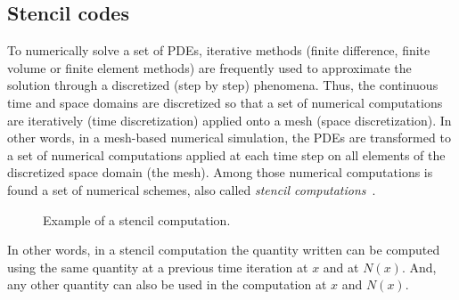 \subsection{Stencil codes}
\label{sect:stencil}
To numerically solve a set of PDEs, iterative methods (finite difference, finite volume or finite element methods) are frequently used to approximate the solution through a discretized (step by step) phenomena. Thus, the continuous time and space domains are discretized so that a set of numerical computations are iteratively (time discretization) applied onto a mesh (space discretization). In other words, in a mesh-based numerical simulation, the PDEs are transformed to a set of numerical computations applied at each time step on all elements of the discretized space domain (the mesh). Among those numerical computations is found a set of numerical schemes, also called \textit{stencil computations}~\cite{spaaTangCKLL11}. 

\begin{figure}[!h]\begin{center}
  \caption{Example of a stencil computation.}
  \label{fig:ex}
\end{center}\end{figure}

In other words, in a stencil computation the quantity written can be computed using the same quantity at a previous time iteration at $x$ and at $N(x)$. And, any other quantity can also be used in the computation at $x$ and $N(x)$.

